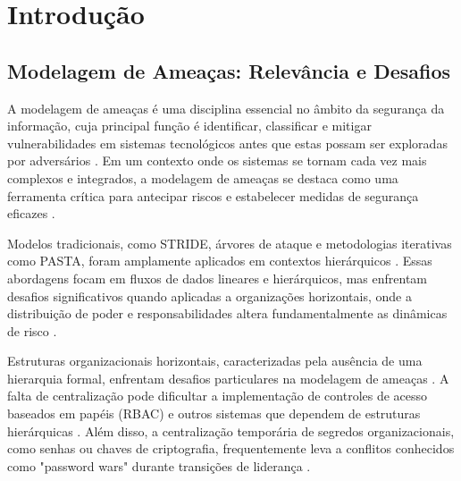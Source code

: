 
%

%

\chapter{Introdução}
\label{cha:Introduction}

\section{Modelagem de Ameaças: Relevância e Desafios}
\label{sec:modelagem_ameacas}

A modelagem de ameaças é uma disciplina essencial no âmbito da segurança da
informação, cuja principal função é identificar, classificar e mitigar
vulnerabilidades em sistemas tecnológicos antes que estas possam ser exploradas
por adversários \cite{ThreatModelingdesigningForSecurity,
ThreatModelingASystematicLiteratureReview}. Em um contexto onde os sistemas se
tornam cada vez mais complexos e integrados, a modelagem de ameaças se destaca
como uma ferramenta crítica para antecipar riscos e estabelecer medidas de
segurança eficazes \cite{DemystifyingTheThreatModelingProcess,
ThreatModelingASummaryOfAvailableMethods}.

Modelos tradicionais, como STRIDE, árvores de ataque e metodologias iterativas
como PASTA, foram amplamente aplicados em contextos hierárquicos
\cite{MicrosoftThreatModelingTechnique, AttackTrees, RiskCentricThreatModeling}.
Essas abordagens focam em fluxos de dados lineares e hierárquicos, mas enfrentam
desafios significativos quando aplicadas a organizações horizontais, onde a
distribuição de poder e responsabilidades altera fundamentalmente as dinâmicas
de risco \cite{EvaluationofCompetingThreatModeling, Colbac}.

Estruturas organizacionais horizontais, caracterizadas pela ausência de uma
hierarquia formal, enfrentam desafios particulares na modelagem de ameaças
\cite{Colbac}. A falta de centralização pode dificultar a implementação de
controles de acesso baseados em papéis (RBAC) e outros sistemas que dependem de
estruturas hierárquicas \cite{Colbac}. Além disso, a centralização temporária de
segredos organizacionais, como senhas ou chaves de criptografia, frequentemente
leva a conflitos conhecidos como "password wars" durante transições de liderança
\cite{FromCounterpublicstoContentious}.

